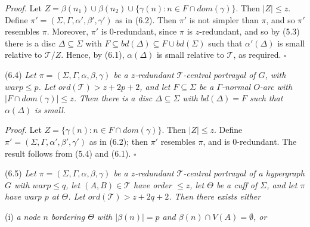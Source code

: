 \textit{Proof.} Let $Z = \beta(n_1) \cup \beta(n_2) \cup \{\gamma(n) : n \in F \cap dom(\gamma)\}$. Then $|Z| \le z$. Define $\pi' = (\Sigma, \Gamma, \alpha', \beta', \gamma')$ as in (6.2). Then $\pi'$ is not simpler than $\pi$, and so $\pi'$ resembles $\pi$. Moreover, $\pi'$ is $0$-redundant, since $\pi$ is $z$-redundant, and so by (5.3) there is a disc $\Delta \subseteq \Sigma$ with $F \subseteq bd(\Delta) \subseteq F \cup bd(\Sigma)$ such that $\alpha'(\Delta)$ is small relative to $\mathscr{T}/Z$. Hence, by (6.1), $\alpha(\Delta)$ is small relative to $\mathscr{T}$, as required. $\square$

\stmt
(6.4) \textit{Let $\pi = (\Sigma, \Gamma, \alpha, \beta, \gamma)$ be a $z$-redundant $\mathscr{T}$-central portrayal of $G$, with $warp \le p$. Let $ord(\mathscr{T}) > z + 2p + 2$, and let $F \subseteq \Sigma$ be a $\Gamma$-normal $O$-arc with $|F \cap dom(\gamma)| \le z$. Then there is a disc $\Delta \subseteq \Sigma$ with $bd(\Delta) = F$ such that $\alpha(\Delta)$ is small.}

\textit{Proof.} Let $Z = \{\gamma(n) : n \in F \cap dom(\gamma)\}$. Then $|Z| \le z$. Define $\pi' = (\Sigma, \Gamma, \alpha', \beta', \gamma')$ as in (6.2); then $\pi'$ resembles $\pi$, and is $0$-redundant. The result follows from (5.4) and (6.1). $\square$

\stmt
(6.5) \textit{Let $\pi = (\Sigma, \Gamma, \alpha, \beta, \gamma)$ be a $z$-redundant $\mathscr{T}$-central portrayal of a hypergraph $G$ with $warp \le q$, let $(A, B) \in \mathscr{T}$ have order $\le z$, let $\Theta$ be a cuff of $\Sigma$, and let $\pi$ have warp $p$ at $\Theta$. Let $ord(\mathscr{T}) > z + 2q + 2$. Then there exists either}

\hspace*{12pt}(i) \textit{a node $n$ bordering $\Theta$ with $|\beta(n)| = p$ and $\beta(n) \cap V(A) = \emptyset$, or}

